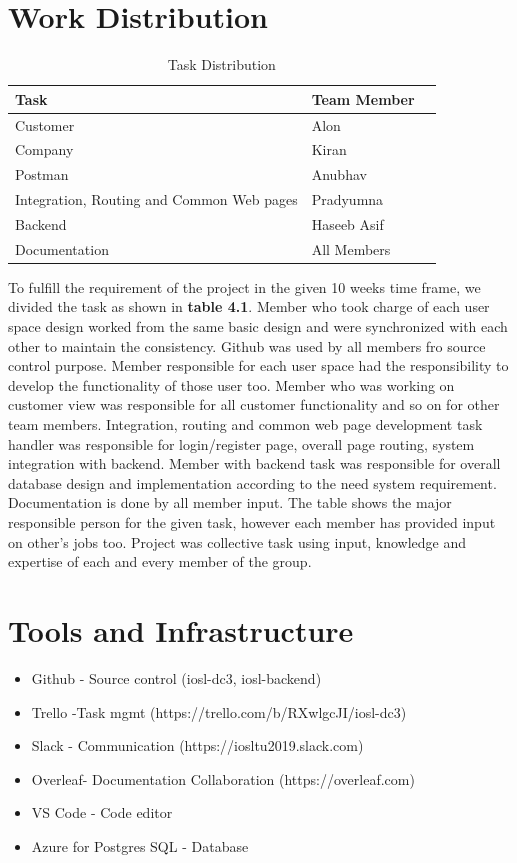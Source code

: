 \section{Work Distribution}
\begin{table}[!ht]
\begin{center}
\begin{tabular}{ |l|l|l| } 
 \hline
\textbf{Task} & \textbf{Team Member} \\
 \hline
Customer & Alon \\
 \hline
Company & Kiran  \\
 \hline
 Postman & Anubhav \\
 \hline
 Integration, Routing and Common Web pages & Pradyumna \\
 \hline
 Backend & Haseeb Asif \\
 \hline
  Documentation & All Members \\
 \hline
\end{tabular}
\end{center}
    \caption{ Task Distribution }
\end{table}
To fulfill the requirement of the project in the given 10 weeks time frame, we divided the task as shown in \textbf{table 4.1}. Member who took charge of each user space design worked from the same basic design and were synchronized with each other to maintain the consistency. Github was used by all members fro source control purpose. Member responsible for each user space had the responsibility to develop the functionality of those user too. Member who was working on customer view was responsible for all customer functionality and so on for other team members. Integration, routing and common web page development task handler was responsible for login/register page, overall page routing, system integration with backend. Member with backend task was responsible for overall database design and implementation according to the need system requirement. Documentation is done by all member input. 
The table shows the major responsible person for the given task, however each member has provided input on other's jobs too. Project was collective task using input, knowledge and expertise of each and every member of the group.
\section{Tools and Infrastructure}

\begin{itemize}
\item Github - Source control (iosl-dc3, iosl-backend)
\item Trello -Task mgmt (https://trello.com/b/RXwlgcJI/iosl-dc3)
\item Slack - Communication (https://iosltu2019.slack.com)
\item Overleaf- Documentation Collaboration (https://overleaf.com)
\item VS Code - Code editor
\item Azure for Postgres SQL - Database
\end{itemize}